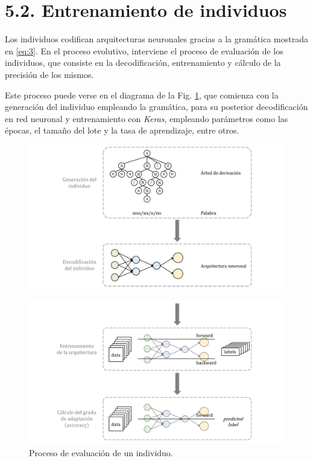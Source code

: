 \documentclass[spanish,a4paper,12pt,twoside]{report}
\begin{document}
 \section*{\Large 5.2. Entrenamiento de individuos}
  Los individuos codifican arquitecturas neuronales gracias a la gramática mostrada en \ref{eq:3}. En el proceso evolutivo, interviene el proceso de evaluación de los individuos, que consiste en la decodificación, entrenamiento y cálculo de la precisión de los mismos. \par
  Este proceso puede verse en el diagrama de la Fig. \ref{fig:16}, que comienza con la generación del individuo empleando la gramática, para su posterior decodificación en red neuronal y entrenamiento con \emph{Keras}, empleando parámetros como las épocas, el tamaño del lote y la tasa de aprendizaje, entre otros. \vfill
  \begin{figure}[H]
    \centering
    \includegraphics[width = 1\textwidth]{resources/Fig16_1.pdf}
  \end{figure} \par
  \vspace{-1cm}
  \begin{figure}[H]
    \centering
    \includegraphics[width = 1\textwidth]{resources/Fig16_2.pdf}
    \caption{Proceso de evaluación de un individuo.}
    \label{fig:16}
  \end{figure} \par
\end{document}
